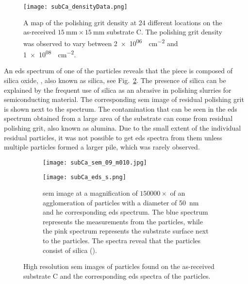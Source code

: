 \begin{figure}[htbp]
    \centering
    \texttt{[image: subCa\_densityData.png]}
    \caption[Map of the polishing grit density on the as-received substrate C.]{A map of the polishing grit density at 24 different locations on the as-received $\SI{15}{\milli\metre}\times\SI{15}{\milli\metre}$ substrate C. The polishing grit density was observed to vary between \SI{2e+06}{\particle\centi\metre^{-2}} and \SI{1e+08}{\particle\centi\metre^{-2}}.}
    \label{fig:subCa_densityData}
\end{figure}

An \ac{eds} spectrum of one of the particles reveals that the piece is composed of silica oxide, , also known as silica, see Fig.~\ref{fig:subCa_polishing-grit}. The presence of silica can be explained by the frequent use of silica as an abrasive in polishing slurries for semiconducting material. The corresponding \ac{sem} image of residual polishing grit is shown next to the spectrum. The  contamination that can be seen in the \ac{eds} spectrum obtained from a large area of the substrate can come from residual  polishing grit, also known as alumina. Due to the small extent of the individual residual particles, it was not possible to get \ac{eds} spectra from them unless multiple particles formed a larger pile, which was rarely observed.

\begin{figure}
    \centering
    \begin{subfigure}[t]{\textwidth}
          \begin{minipage}[t]{0.4\linewidth}
            \centering
            \texttt{[image: subCa\_sem\_09\_m010.jpg]}
          \end{minipage}
          \hspace{0.02\linewidth}
          \begin{minipage}[t]{0.56\linewidth}
            \centering
            \texttt{[image: subCa\_eds\_s.png]}
          \end{minipage}
        \caption{\Ac{sem} image at a magnification of $150000\times$ of an agglomeration of particles with a diameter of \SI{50}{\nano\metre} and he corresponding \ac{eds} spectrum. The blue spectrum represents the measurements from the particles, while the pink spectrum represents the substrate surface next to the particles. The spectra reveal that the particles consist of silica ().}\label{fig:subCa_polishing-grit}
    \end{subfigure}%
    \caption[\Ac{sem} images and \ac{eds} spectra of particles found on as-received substrate C.]{High resolution \acf{sem} images of particles found on the as-received substrate C and the corresponding \acf{eds} spectra of the particles.}\label{fig:subCa_sem_w_eds}
\end{figure}

